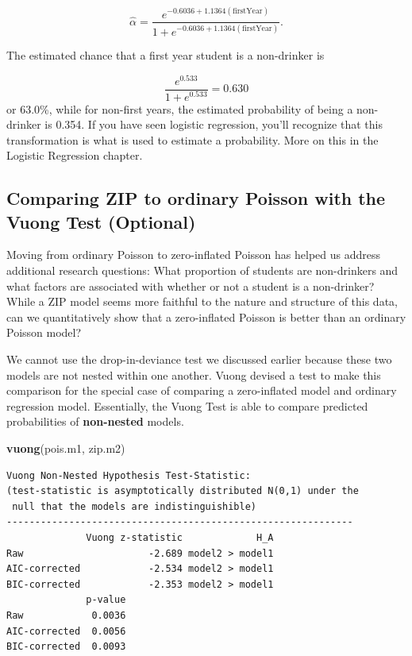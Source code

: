 \documentclass[
]{krantz}
\newenvironment{Shaded}{\begin{snugshade}}{\end{snugshade}}
\newcommand{\KeywordTok}[1]{\textcolor[rgb]{0.27,0.27,0.27}{\textbf{#1}}}
\newcommand{\NormalTok}[1]{#1}
\begin{document}
\[
 \hat{\alpha} =
 \frac{e^ {-0.6036+1.1364(\textrm{firstYear})}}
 {1+e^{
 -0.6036+1.1364(\textrm{firstYear})
 }
 }.
 \]

The estimated chance that a first year student is a non-drinker is

\[
\frac{e^{0.533}}{1+e^{0.533}} = 0.630
\]
or 63.0\%, while for non-first years, the estimated probability of being a non-drinker is 0.354. If you have seen logistic regression, you'll recognize that this transformation is what is used to estimate a probability. More on this in the Logistic Regression chapter.

\hypertarget{comparing-zip-to-ordinary-poisson-with-the-vuong-test-optional}{%
\subsection{Comparing ZIP to ordinary Poisson with the Vuong Test (Optional)}\label{comparing-zip-to-ordinary-poisson-with-the-vuong-test-optional}}

Moving from ordinary Poisson to zero-inflated Poisson has helped us address additional research questions: What proportion of students are non-drinkers and what factors are associated with whether or not a student is a non-drinker? While a ZIP model seems more faithful to the nature and structure of this data, can we quantitatively show that a zero-inflated Poisson is better than an ordinary Poisson model?

We cannot use the drop-in-deviance test we discussed earlier because these two models are not nested within one another. Vuong \citeyearpar{Vuong1989} devised a test to make this comparison for the special case of comparing a zero-inflated model and ordinary regression model. Essentially, the Vuong Test  is able to compare predicted probabilities of \textbf{non-nested} models.

\begin{Shaded}
\begin{Highlighting}[]
\KeywordTok{vuong}\NormalTok{(pois.m1, zip.m2)}
\end{Highlighting}
\end{Shaded}

\begin{verbatim}
Vuong Non-Nested Hypothesis Test-Statistic: 
(test-statistic is asymptotically distributed N(0,1) under the
 null that the models are indistinguishible)
-------------------------------------------------------------
              Vuong z-statistic             H_A
Raw                      -2.689 model2 > model1
AIC-corrected            -2.534 model2 > model1
BIC-corrected            -2.353 model2 > model1
              p-value
Raw            0.0036
AIC-corrected  0.0056
BIC-corrected  0.0093
\end{verbatim}
\end{document}
